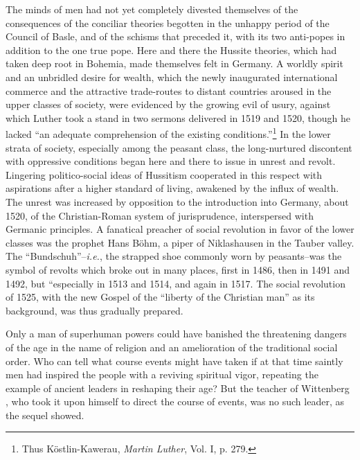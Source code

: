 The minds of men had not yet completely divested themselves of
the consequences of the conciliar theories begotten in the unhappy
period of the Council of Basle, and of the schisms that preceded
it, with its two anti-popes in addition to the one true pope. Here
and there the Hussite theories, which had taken deep root in Bohemia,
made themselves felt in Germany. A worldly spirit and an unbridled
desire for wealth, which the newly inaugurated international commerce
and the attractive trade-routes to distant countries aroused in
the upper classes of society, were evidenced by the growing evil
of usury, against which Luther took a stand in two sermons delivered in
1519 and 1520, though he lacked “an adequate comprehension of the existing
conditions.”\footnote{Thus Köstlin-Kawerau, \textit{Martin Luther}, Vol. I, p. 279.}
In the lower strata of
society, especially among the peasant class, the long-nurtured discontent
with oppressive conditions began here and there to issue
in unrest and revolt. Lingering politico-social ideas of Hussitism
cooperated in this respect with aspirations after a higher standard
of living, awakened by the influx of wealth. The unrest was increased
by opposition to the introduction into Germany, about 1520, of
the Christian-Roman system of jurisprudence, interspersed with Germanic
principles. A fanatical preacher of social revolution in favor
of the lower classes was the prophet Hans Böhm, a piper of Niklashausen
in the Tauber valley. The “Bundschuh”--\textit{i.e.}, the strapped
shoe commonly worn by peasants--was the symbol of revolts which
broke out in many places, first in 1486, then in 1491 and 1492, but
“especially in 1513 and 1514, and again in 1517. The social revolution
of 1525, with the new Gospel of the “liberty of the Christian
man” as its background, was thus gradually prepared.

Only a man of superhuman powers could have banished the
threatening dangers of the age in the name of religion and an amelioration
of the traditional social order. Who can tell what course
events might have taken if at that time saintly men had inspired
the people with a reviving spiritual vigor, repeating the example
of ancient leaders in reshaping their age? But the teacher of Wittenberg
, who took it upon himself to direct the course of events, was no
such leader, as the sequel showed.

